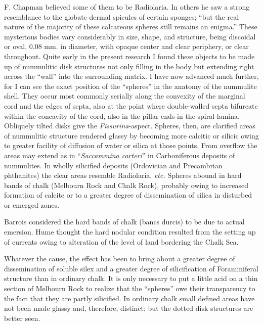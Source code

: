 \documentclass[a4paper, 12pt, oneside]{article}
\begin{document}
F. Chapman believed some of them to be Radiolaria. In others he saw a strong resemblance to the globate dermal spicules of certain sponges; ``but the real nature of the majority of these calcareous spheres still remains an enigma.'' These mysterious bodies vary considerably in size, shape, and structure, being discoidal or oval, 0.08 mm. in diameter, with opaque center and clear periphery, or clear throughout. Quite early in the present research I found these objects to be made up of nummulitic disk structures not only filling in the body but extending right across the ``wall'' into the surrounding matrix. I have now advanced much further, for I can see the exact position of the ``spheres'' in the anatomy of the nummulite shell. They occur most commonly serially along the convexity of the marginal cord and the edges of septa, also at the point where double-walled septa bifurcate within the concavity of the cord, also in the pillar-ends in the spiral lamina. Obliquely tilted disks give the \emph{Fissurina}-aspect. Spheres, then, are clarified areas of nummulitic structure rendered glassy by becoming more calcitic or silicic owing to greater facility of diffusion of water or silica at those points. From overflow the areas may extend as in ``\emph{Saccammina carteri}'' in Carboniferous deposits of nummulites. In wholly silicified deposits (Ordovician and Precambrian phthanites) the clear areas resemble Radiolaria, \emph{etc.} Spheres abound in hard bands of chalk (Melbourn Rock and Chalk Rock), probably owing to increased formation of calcite or to a greater degree of dissemination of silica in disturbed or emerged zones.

Barrois considered the hard bands of chalk (bancs durcis) to be due to actual emersion. Hume thought the hard nodular condition resulted from the setting up of currents owing to alteration of the level of land bordering the Chalk Sea.

Whatever the cause, the effect has been to bring about a greater degree of dissemination of soluble silex and a greater degree of silicification of Foraminiferal structure than in ordinary chalk. It is only necessary to put a little acid on a thin section of Melbourn Rock to realize that the ``spheres'' owe their transparency to the fact that they are partly silicified. In ordinary chalk small defined areas have not been made glassy and, therefore, distinct; but the dotted disk structures are better seen.
\end{document}
